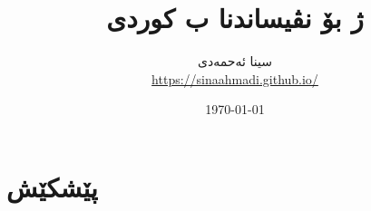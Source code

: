 \documentclass[14pt]{article}
\title{\textenglish{\XeLaTeX} ژ بۆ نڤیساندنا ب کوردی}
\author{سینا ئەحمەدی \\ {\small \url{https://sinaahmadi.github.io/}}}
\date{\today}
\begin{document}
\maketitle
\tableofcontents

\begin{abstract}
\end{abstract}



\section{پێشکێش}
\end{document}
